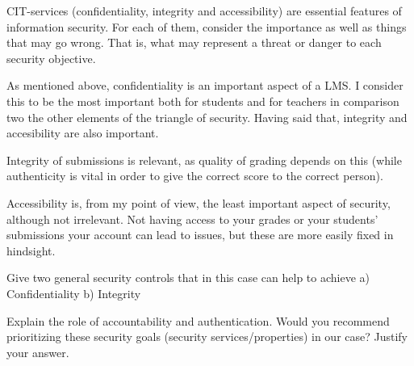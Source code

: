 \documentclass{myassignment}
\begin{document}
	\begin{problem}
		CIT-services (confidentiality, integrity and accessibility) are essential features of information security. For each of them, consider the importance as well as things that may go wrong. That is, what may represent a threat or danger to each security objective.%
	\end{problem}

	\begin{answer}
		As mentioned above, confidentiality is an important aspect of a LMS. I consider this to be the most important both for students and for teachers in comparison two the other elements of the triangle of security. Having said that, integrity and accesibility are also important.

		Integrity of submissions is relevant, as quality of grading depends on this (while authenticity is vital in order to give the correct score to the correct person).
		
		Accessibility is, from my point of view, the least important aspect of security, although not irrelevant. Not having access to your grades or your students' submissions your account can lead to issues, but these are more easily fixed in hindsight. 
	\end{answer}

	\begin{problem}
		Give two general security controls that in this case can help to achieve%
			a) Confidentiality%
			b) Integrity%
	\end{problem}

	\begin{answer}
		
	\end{answer}

	\begin{problem}
		Explain the role of accountability and authentication. Would you recommend prioritizing these security goals (security services/properties) in our case? Justify your answer.%
	\end{problem}

	\begin{answer}

	\end{answer}
\end{document}
